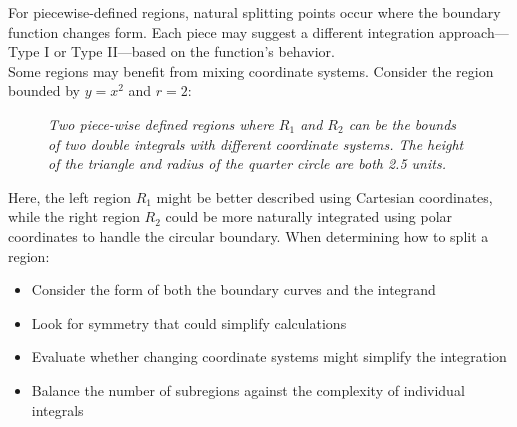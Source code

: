 \noindent For piecewise-defined regions, natural splitting points occur where the boundary function changes form. Each piece may suggest a different integration approach—Type I or Type II—based on the function's behavior. \\

\noindent Some regions may benefit from mixing coordinate systems. Consider the region bounded by $y = x^2$ and $r = 2$:

\begin{figure}[H]
\begin{center}
\end{center}
\caption{\textit{Two piece-wise defined regions where $R_1$ and $R_2$ can be the bounds of two double integrals with different coordinate systems. The height of the triangle and radius of the quarter circle are both 2.5 units.}}
\label{fig:doubleregion}
\end{figure}

\noindent Here, the left region $R_1$ might be better described using Cartesian coordinates, while the right region $R_2$ could be more naturally integrated using polar coordinates to handle the circular boundary. When determining how to split a region:
\begin{itemize}
    \item Consider the form of both the boundary curves and the integrand
    \item Look for symmetry that could simplify calculations
    \item Evaluate whether changing coordinate systems might simplify the integration
    \item Balance the number of subregions against the complexity of individual integrals
\end{itemize}

